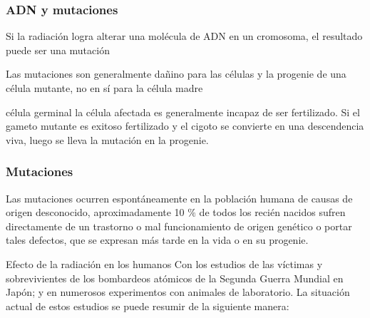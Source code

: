 \documentclass{beamer}
\begin{document}
\begin{frame}
	\frametitle{ADN y mutaciones}
  
  \begin{block}{}
  	  Si la radiación logra alterar una molécula de ADN en un cromosoma, el resultado puede ser una mutación 
  \end{block}

  
  
  
  \begin{block}{}
  	 Las mutaciones son generalmente dañino para las células y la progenie de una célula mutante, no en sí para la célula madre
  \end{block}
 
  \begin{block}{célula germinal}
  	la célula afectada es
  	generalmente incapaz de ser fertilizado. Si el gameto mutante es exitoso fertilizado y el cigoto se convierte en una descendencia viva, luego se lleva la mutación en la progenie. 
  \end{block}
  
  
\end{frame}
  


\begin{frame}
	\frametitle{Mutaciones}
	
   Las mutaciones ocurren espontáneamente en la población humana de causas de origen desconocido, aproximadamente 10 $\%$ de todos los recién nacidos sufren directamente de un trastorno o mal funcionamiento de origen genético o portar tales defectos, que se expresan más tarde en la vida o en su progenie.\\
   
   \begin{block}{Efecto de la radiación en los humanos}
   	Con los estudios de las víctimas y sobrevivientes de los bombardeos atómicos de la Segunda Guerra Mundial en Japón; y en numerosos experimentos con animales de laboratorio. La situación actual de estos estudios se puede resumir de la siguiente manera:\\	
   \end{block}
   
   
\end{frame}
\end{document}
